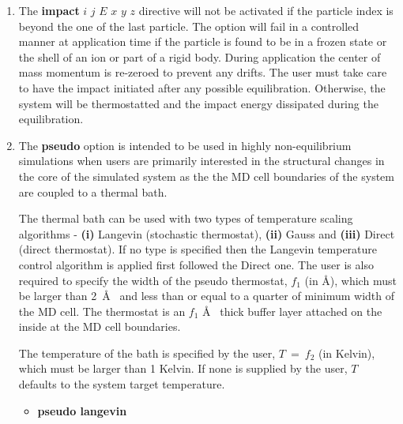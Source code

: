 \begin{enumerate}
\item The {\bf impact} $i$ $j$ $E$ $x$ $y$ $z$ directive will
not be activated if the particle index is beyond the one of
the last particle.  The option will fail in a controlled manner
at application time if the particle is found to be in a frozen
state or the shell of an ion or part of a rigid body.  During
application the center of mass momentum is re-zeroed to prevent
any drifts.  The user must take care to have the impact
initiated after any possible equilibration.  Otherwise, the
system will be thermostatted and the impact energy dissipated
during the equilibration.

\item The {\bf pseudo} option is intended to be used in highly
non-equilibrium simulations when users are primarily interested in
the structural changes in the core of the simulated system as the
the MD cell boundaries of the system are coupled to a thermal bath.

The thermal bath can be used with two types of temperature scaling
algorithms - {\bf(i)} Langevin (stochastic thermostat), {\bf(ii)} Gauss
and {\bf(iii)} Direct (direct thermostat).  If no type is specified then
the Langevin temperature control algorithm is applied first followed the
Direct one.  The user is also required to specify the width of the
pseudo thermostat, $f_{1}$ (in \AA), which must be larger than 2~\AA~
and less than or equal to a quarter of minimum width of the MD cell.
The thermostat is an $f_{1}$ \AA~ thick buffer layer attached on the
inside at the MD cell boundaries.

The temperature of the bath is specified by the user, $T~=~f_{2}$
(in Kelvin), which must be larger than 1 Kelvin.  If none is supplied
by the user, $T$ defaults to the system target temperature.

\begin{itemize}
\item {\bf pseudo langevin}


\end{itemize}
\end{enumerate}
